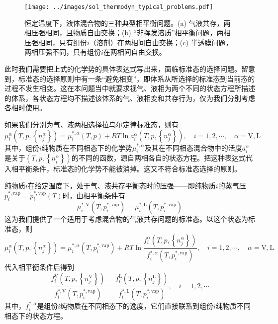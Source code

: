 \documentclass[main.tex]{subfiles}
\begin{document}
\begin{figure}[ht]
  \centering
  \texttt{[image: ../images/sol\_thermodyn\_typical\_problems.pdf]}
  \caption{恒定温度下，液体混合物的三种典型相平衡问题。(a) 气液共存，两相压强相同，且物质自由交换；(b) “非挥发溶质”相平衡问题，两相压强相同，只有组份$i$（溶剂）在两相间自由交换；(c) 半透膜问题，两相压强不同，只有组份$i$在两相间自由交换。}
  \label{fig:sol_thermodyn_typical_problems}
\end{figure}

此时我们需要把上式的化学势的具体表达式写出来，面临标准态的选择问题。留意到，标准态的选择原则中有一条“避免相变”，即体系从所选择的标准态到当前态的过程不发生相变。这在本问题当中就要求视气、液相为两个不同的状态方程所描述的体系，各状态方程均不描述该体系的气、液相变和共存行为，仅为我们分别考虑各相时使用。

如果我们分别为气、液两相选择拉乌尔定律标准态，则有
\begin{equation*}
  \mu_i^\alpha\left(T,p,\left\{n_j^\alpha\right\}\right)=\mu_i^{*,\alpha}\left(T,p\right)+RT\ln a_i^\alpha\left(T,p,\left\{n_j^\alpha\right\}\right),\quad i=1,2,\cdots,\quad \alpha=\text{V},\text{L}
\end{equation*}
其中，组份$i$纯物质在不同相态下的化学势$\mu_i^{*,\alpha}$及其在不同相态混合物中的活度$a_i^\alpha$是关于$\left(T,p,\left\{n_i^\alpha\right\}\right)$的不同的函数，源自两相各自的状态方程。把这种表达式代入相平衡条件，标准态的化学势不能被消掉。这又不符合标准态选择的原则。

纯物质$i$在给定温度下，处于气、液共存平衡态时的压强——即纯物质$i$的蒸气压$p_i^{*,\text{vap}}=p_i^{*,\text{vap}}\left(T\right)$时，由相平衡条件有
\[\mu_i^{*,\text{V}}\left(T,p_i^{*,\text{vap}}\right)=\mu_i^{*,\text{L}}\left(T,p_i^{*,\text{vap}}\right)\]
这为我们提供了一个适用于考虑混合物的气液共存问题的标准态。以这个状态为标准态，则
\begin{equation}\label{eq:II.5_chemical_potential_vapor_liquid_equilibrium}
  \mu_i^\alpha\left(T,p,\left\{n_j^\alpha\right\}\right)=\mu_i^{*,\alpha}\left(T,p_i^{*,\text{vap}}\right)+RT\ln\frac{f_i^\alpha\left(T,p,\left\{n_j^\alpha\right\}\right)}{f_i^{*,\alpha}\left(T,p_i^{*,\text{vap}}\right)},\quad i=1,2,\cdots,\quad\alpha=\text{V},\text{L}
\end{equation}
代入相平衡条件后得到
\begin{equation}\label{eq:II.5_vapor-liquid_equilibrium_fugacity}
  \frac{f_i^\text{V}\left(T,p,\left\{n_j^\text{V}\right\}\right)}{f_i^{*,\text{V}}\left(T,p_i^{*,\text{vap}}\right)}=\frac{f_i^\text{L}\left(T,p,\left\{n_j^\text{L}\right\}\right)}{f_i^{*,\text{L}}\left(T,p_i^{*,\text{vap}}\right)},\quad i=1,2,\cdots
\end{equation}
其中，$f_i^{*,\alpha}$是组份$i$纯物质在不同相态下的逸度，它们直接联系到组份$i$纯物质不同相态下的状态方程。
\end{document}
